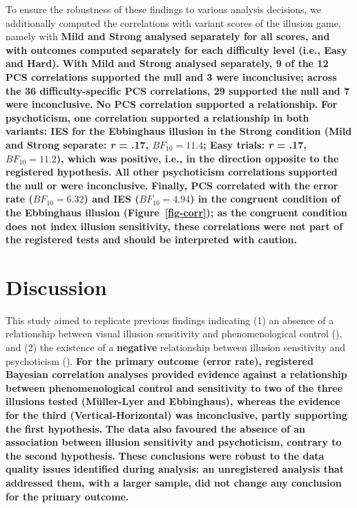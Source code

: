\documentclass[
  man,
  floatsintext,
  longtable,
  nolmodern,
  notxfonts,
  notimes,
  colorlinks=true,linkcolor=blue,citecolor=blue,urlcolor=blue]{apa7}
\begin{document}
To ensure the robustness of these findings to various analysis
decisions, we additionally computed the correlations with variant scores
of the illusion game, namely with \textbf{Mild and Strong analysed
separately for all scores, and with outcomes computed separately for
each difficulty level (i.e., Easy and Hard).} \textbf{With Mild and
Strong analysed separately, 9 of the 12 PCS correlations supported the
null and 3 were inconclusive; across the 36 difficulty-specific PCS
correlations, 29 supported the null and 7 were inconclusive.} \textbf{No
PCS correlation supported a relationship.} \textbf{For psychoticism, one
correlation supported a relationship in both variants: IES for the
Ebbinghaus illusion in the Strong condition (Mild and Strong separate:
\emph{r} = .17, \(BF_{10} = 11.4\); Easy trials: \emph{r} = .17,
\(BF_{10} = 11.2\)), which was positive, i.e., in the direction opposite
to the registered hypothesis.} \textbf{All other psychoticism
correlations supported the null or were inconclusive.} \textbf{Finally,
PCS correlated with the error rate (\(BF_{10} = 6.32\)) and IES
(\(BF_{10} = 4.94\)) in the congruent condition of the Ebbinghaus
illusion (Figure~\ref{fig-corr}); as the congruent condition does not
index illusion sensitivity, these correlations were not part of the
registered tests and should be interpreted with caution.}

\section{Discussion}\label{discussion}

This study aimed to replicate previous findings indicating (1) an
absence of a relationship between visual illusion sensitivity and
phenomenological control (),
and (2) the existence of a \textbf{negative} relationship between
illusion sensitivity and psychoticism
(). \textbf{For the
primary outcome (error rate), registered Bayesian correlation analyses
provided evidence against a relationship between phenomenological
control and sensitivity to two of the three illusions tested
(Müller-Lyer and Ebbinghaus), whereas the evidence for the third
(Vertical-Horizontal) was inconclusive, partly supporting the first
hypothesis.} \textbf{The data also favoured the absence of an
association between illusion sensitivity and psychoticism, contrary to
the second hypothesis.} \textbf{These conclusions were robust to the
data quality issues identified during analysis: an unregistered analysis
that addressed them, with a larger sample, did not change any conclusion
for the primary outcome.}
\end{document}
